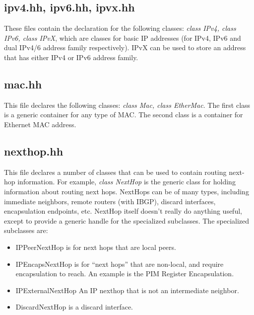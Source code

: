 \documentclass[11pt]{article}
\begin{document}
\subsection{ipv4.hh, ipv6.hh, ipvx.hh}

These files contain the declaration for the following classes:
\emph{class IPv4, class IPv6, class IPvX}, which are
classes for basic IP addresses (for IPv4, IPv6 and dual IPv4/6
address family respectively). IPvX can be used to store an
address that has either IPv4 or IPv6 address family.

\subsection{mac.hh}

This file declares the following classes: \emph{class Mac, class
EtherMac}. The first class is a generic container for any type of MAC.
The second class is a container for Ethernet MAC address.

\subsection{nexthop.hh}

This file declares a number of classes that can be used to contain
routing next-hop information. For example, \emph{class NextHop}
is the generic class for holding information about routing
next hops.  NextHops can be of many types, including immediate
neighbors, remote routers (with IBGP), discard interfaces,
encapsulation endpoints, etc.  NextHop itself doesn't really do
anything useful, except to provide a generic handle for the
specialized subclasses. The specialized subclasses are:

\begin{itemize}

  \item IPPeerNextHop is for next hops that are local peers.

  \item IPEncapsNextHop is for ``next hops'' that are non-local, and require
   encapsulation to reach. An example is the PIM Register Encapsulation.

  \item IPExternalNextHop An IP nexthop that is not an intermediate
  neighbor.

  \item DiscardNextHop is a discard interface.

\end{itemize}
\end{document}
